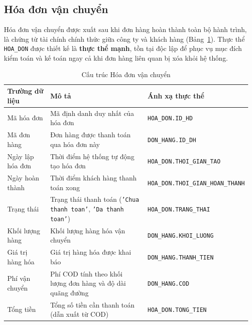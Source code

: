 \documentclass[11pt]{report}
\begin{document}
\subsection{Hóa đơn vận chuyển}
\label{subsec:hoadon_vanchuyen}

Hóa đơn vận chuyển được xuất sau khi đơn hàng hoàn thành toàn bộ hành trình, là chứng từ tài chính chính thức giữa công ty và khách hàng (Bảng~\ref{tab:hoadon}). Thực thể \texttt{HOA\_DON} được thiết kế là \textbf{thực thể mạnh}, tồn tại độc lập để phục vụ mục đích kiểm toán và kế toán ngay cả khi đơn hàng liên quan bị xóa khỏi hệ thống.

\begin{table}[H]
    \centering
    \renewcommand{\tabularxcolumn}[1]{m{#1}}
    \begin{tabularx}{\textwidth}{|l|>{\raggedright\arraybackslash}X|l|} \hline
        \rowcolor{teal!30}
        \textbf{Trường dữ liệu} & \textbf{Mô tả} & \textbf{Ánh xạ thực thể} \\ \hline
        Mã hóa đơn       & Mã định danh duy nhất của hóa đơn                                            & \texttt{\footnotesize HOA\_DON.ID\_HD} \\ \hline
        Mã đơn hàng      & Đơn hàng được thanh toán qua hóa đơn này                                     & \texttt{\footnotesize DON\_HANG.ID\_DH} \\ \hline
        Ngày lập hóa đơn & Thời điểm hệ thống tự động tạo hóa đơn                                       & \texttt{\footnotesize HOA\_DON.THOI\_GIAN\_TAO} \\ \hline
        Ngày hoàn thành  & Thời điểm khách hàng thanh toán xong                                         & \texttt{\footnotesize HOA\_DON.THOI\_GIAN\_HOAN\_THANH} \\ \hline
        Trạng thái       & Trạng thái thanh toán (\texttt{'Chua thanh toan'}, \texttt{'Da thanh toan'}) & \texttt{\footnotesize HOA\_DON.TRANG\_THAI} \\ \hline
        Khối lượng hàng  & Khối lượng hàng hóa vận chuyển                                               & \texttt{\footnotesize DON\_HANG.KHOI\_LUONG} \\ \hline
        Giá trị hàng hóa & Giá trị hàng hóa được khai báo                                               & \texttt{\footnotesize DON\_HANG.THANH\_TIEN} \\ \hline
        Phí vận chuyển   & Phí COD tính theo khối lượng đơn hàng và độ dài quãng đường                  & \texttt{\footnotesize DON\_HANG.COD} \\ \hline
        Tổng tiền        & Tổng số tiền cần thanh toán (dẫn xuất từ COD)                                & \texttt{\footnotesize HOA\_DON.TONG\_TIEN} \\ \hline
    \end{tabularx}
    \caption{Cấu trúc Hóa đơn vận chuyển}
    \label{tab:hoadon}
\end{table}
\end{document}
